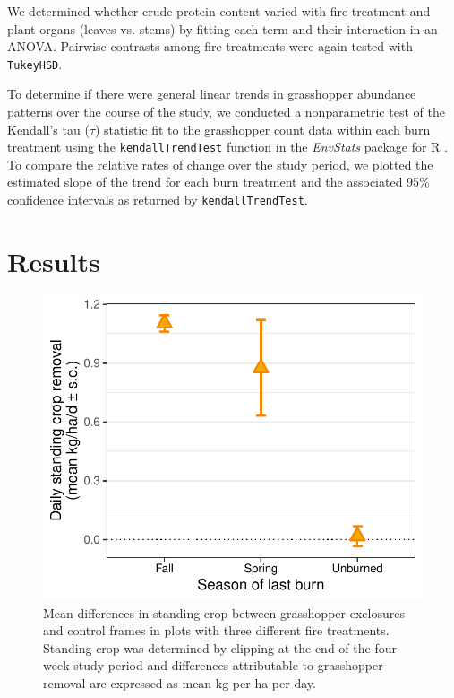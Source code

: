 \documentclass[referee, 
	            sn-basic]
           {sn-jnl}
\begin{document}
\begin{linenumbers}
We determined whether crude protein content varied with fire treatment and plant organs (leaves vs. stems) by fitting each term and their interaction in an ANOVA.
Pairwise contrasts among fire treatments were again tested with \texttt{TukeyHSD}.

To determine if there were general linear trends in grasshopper abundance patterns over the course of the study, we conducted a nonparametric test of the Kendall's tau (\(\tau\)) statistic fit to the grasshopper count data within each burn treatment using the \texttt{kendallTrendTest} function in the \emph{EnvStats} package for
\textsf{R} \citep{millard2013}.
To compare the relative rates of change over the study period, we plotted the estimated slope of the trend for each burn treatment and the associated 95\% confidence intervals as returned by \texttt{kendallTrendTest}.

\section{Results}

\begin{figure}
\centering
\includegraphics{removal_gg-1.pdf}
\caption{Mean differences in standing crop between grasshopper exclosures and control frames in plots with three different fire treatments. 
Standing crop was determined by clipping at the end of the four-week study period and differences attributable to grasshopper removal are expressed as mean kg per ha per day.}
\label{removal} %
\end{figure}


\end{linenumbers}
\end{document}
